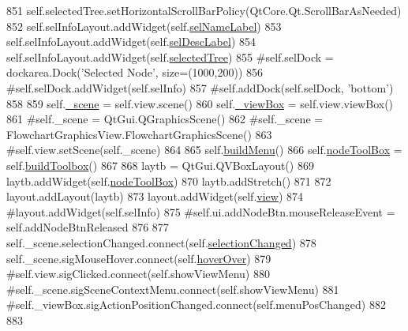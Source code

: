 \begin{DoxyCode}
851         self.selectedTree.setHorizontalScrollBarPolicy(QtCore.Qt.ScrollBarAsNeeded)
852         self.selInfoLayout.addWidget(self.\hyperlink{classFlowchart_1_1FlowchartWidget_a3a9d580264503de8d51279bc0ab7fb28}{selNameLabel})
853         self.selInfoLayout.addWidget(self.\hyperlink{classFlowchart_1_1FlowchartWidget_a125c2e77ef484511338053bcd60dc20c}{selDescLabel})
854         self.selInfoLayout.addWidget(self.\hyperlink{classFlowchart_1_1FlowchartWidget_a4309a7cf46d773c98800badec5c93f52}{selectedTree})
855         \textcolor{comment}{#self.selDock = dockarea.Dock('Selected Node', size=(1000,200))}
856         \textcolor{comment}{#self.selDock.addWidget(self.selInfo)}
857         \textcolor{comment}{#self.addDock(self.selDock, 'bottom')}
858         
859         self.\hyperlink{classFlowchart_1_1FlowchartWidget_af513b5f001b0b74f9da771e213020c71}{\_scene} = self.view.scene()
860         self.\hyperlink{classFlowchart_1_1FlowchartWidget_ad71dd8d28c3339ceba6d35ff2767ad20}{\_viewBox} = self.view.viewBox()
861         \textcolor{comment}{#self.\_scene = QtGui.QGraphicsScene()}
862         \textcolor{comment}{#self.\_scene = FlowchartGraphicsView.FlowchartGraphicsScene()}
863         \textcolor{comment}{#self.view.setScene(self.\_scene)}
864         
865         self.\hyperlink{classFlowchart_1_1FlowchartWidget_ad27da89f568cfc93b56b0910b9fb6d46}{buildMenu}()
866         self.\hyperlink{classFlowchart_1_1FlowchartWidget_a09e33d8ab2bea70edf770d8a41940b70}{nodeToolBox} = self.\hyperlink{classFlowchart_1_1FlowchartWidget_af9ba735553432421b4820551d3ff9a4d}{buildToolbox}()
867         
868         laytb = QtGui.QVBoxLayout()
869         laytb.addWidget(self.\hyperlink{classFlowchart_1_1FlowchartWidget_a09e33d8ab2bea70edf770d8a41940b70}{nodeToolBox})
870         laytb.addStretch()
871         
872         layout.addLayout(laytb)
873         layout.addWidget(self.\hyperlink{classFlowchart_1_1FlowchartWidget_a8ee88da9be1a80e14f5cd4445ee9817e}{view})
874         \textcolor{comment}{#layout.addWidget(self.selInfo)}
875         \textcolor{comment}{#self.ui.addNodeBtn.mouseReleaseEvent = self.addNodeBtnReleased}
876             
877         self.\_scene.selectionChanged.connect(self.\hyperlink{classFlowchart_1_1FlowchartWidget_ac4871b18952de8ef13c0a4a450443976}{selectionChanged})
878         self.\_scene.sigMouseHover.connect(self.\hyperlink{classFlowchart_1_1FlowchartWidget_a2a19ac749492773867c4829265962cbe}{hoverOver})
879         \textcolor{comment}{#self.view.sigClicked.connect(self.showViewMenu)}
880         \textcolor{comment}{#self.\_scene.sigSceneContextMenu.connect(self.showViewMenu)}
881         \textcolor{comment}{#self.\_viewBox.sigActionPositionChanged.connect(self.menuPosChanged)}
882         
883         
\end{DoxyCode}



